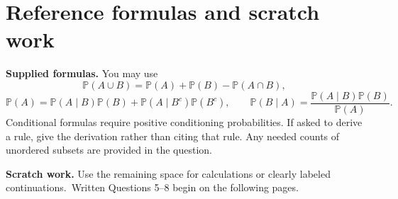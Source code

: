 \clearpage
\section*{Reference formulas and scratch work}
\begin{small}
\textbf{Supplied formulas.} You may use
\[
\mathbb P(A\cup B)=\mathbb P(A)+\mathbb P(B)-\mathbb P(A\cap B),
\]
\[
\mathbb P(A)=\mathbb P(A\mid B)\mathbb P(B)+\mathbb P(A\mid B^c)\mathbb P(B^c),
\qquad
\mathbb P(B\mid A)=\frac{\mathbb P(A\mid B)\mathbb P(B)}{\mathbb P(A)}.
\]
Conditional formulas require positive conditioning probabilities. If asked to derive a rule, give the derivation rather than citing that rule. Any needed counts of unordered subsets are provided in the question.
\end{small}

\medskip
\providecommand{\scratchnote}{Use the remaining space for calculations or clearly labeled continuations.}
\textbf{Scratch work.} \scratchnote\ Written Questions 5--8 begin on the following pages.
